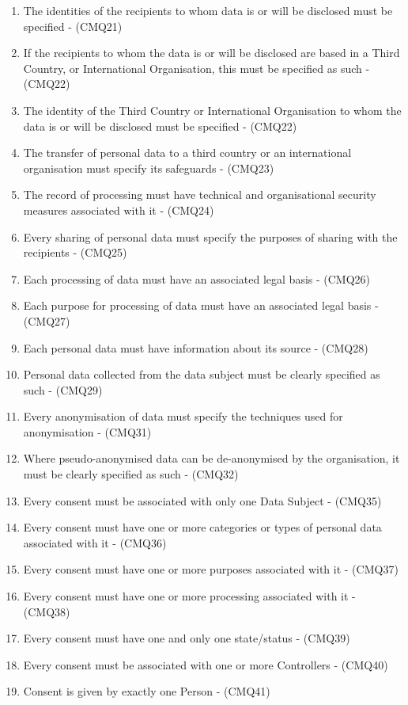 \begin{enumerate}[label={\textit{C.\theenumi}}]
    \item The identities of the recipients to whom data is or will be disclosed must be specified - (CMQ21)
    \item If the recipients to whom the data is or will be disclosed are based in a Third Country, or International Organisation, this must be specified as such - (CMQ22)
    \item The identity of the Third Country or International Organisation to whom the data is or will be disclosed must be specified - (CMQ22)
    \item The transfer of personal data to a third country or an international organisation must specify its safeguards - (CMQ23)
    \item The record of processing must have technical and organisational security measures associated with it - (CMQ24)
    \item Every sharing of personal data must specify the purposes of sharing with the recipients - (CMQ25)
    \item Each processing of data must have an associated legal basis - (CMQ26)
    \item Each purpose for processing of data must have an associated legal basis - (CMQ27)
    \item Each personal data must have information about its source - (CMQ28)
    \item Personal data collected from the data subject must be clearly specified as such - (CMQ29)
    \item Every anonymisation of data must specify the techniques used for anonymisation - (CMQ31)
    \item Where pseudo-anonymised data can be de-anonymised by the organisation, it must be clearly specified as such - (CMQ32)
    \item Every consent must be associated with only one Data Subject - (CMQ35)
    \item Every consent must have one or more categories or types of personal data associated with it - (CMQ36)
    \item Every consent must have one or more purposes associated with it - (CMQ37)
    \item Every consent must have one or more processing associated with it - (CMQ38)
    \item Every consent must have one and only one state/status - (CMQ39)
    \item Every consent must be associated with one or more Controllers - (CMQ40)
    \item Consent is given by exactly one Person - (CMQ41)

\end{enumerate}
